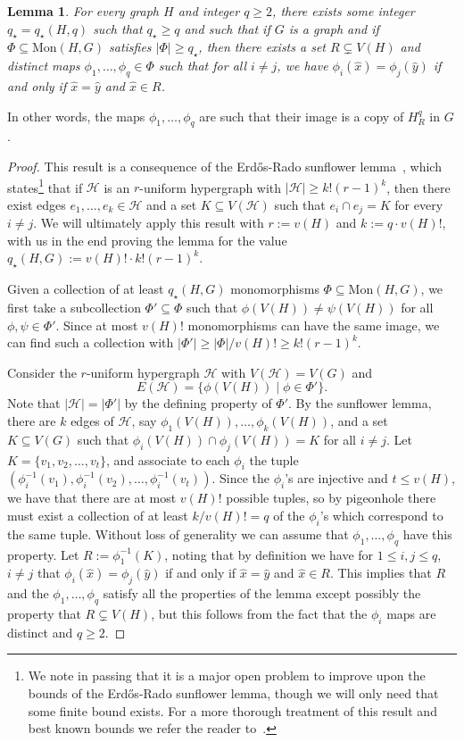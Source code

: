 \documentclass[12pt,letterpaper]{article}
\newtheorem{lemma}[theorem]{Lemma}
\theoremstyle{definition}
\newcommand{\pow}{q} %
\newcommand{\Pow}{{q_\star}} %
\renewcommand{\c}[1]{\mathcal{#1}}
\newcommand{\sub}{\subseteq}
\begin{document}
	
	\begin{lemma}\label{lemma:sunflower}
		For every graph $H$ and integer $\pow \ge 2$, there exists some integer $\Pow=\Pow(H,q)$ such that $\Pow\ge \pow$ and such that if $G$ is a graph and if $\Phi\subseteq \mathrm{Mon}(H,G)$ satisfies $|\Phi|\ge \Pow$, then there exists a set $R\subsetneq V(H)$ and distinct maps $\phi_1,\ldots,\phi_\pow\in \Phi$ such that for all $i\ne j$, we have $\phi_i(\hat{x})=\phi_j(\hat{y})$ if and only if $\hat{x}=\hat{y}$ and $\hat{x}\in R$.
	\end{lemma}
	In other words, the maps $\phi_1,\ldots,\phi_q$ are such that their image is a copy of $H_R^\pow$ in $G$.
	\begin{proof}
		This result is a consequence of the Erd\H{o}s-Rado sunflower lemma~\cite{ER1960}, which states\footnote{We note in passing that it is a major open problem to improve upon the bounds of the Erd\H{o}s-Rado sunflower lemma, though we will only need that some finite bound exists.  For a more thorough treatment of this result and best known bounds we refer the reader to~\cite{ALWZ2021}.} that if $\c{H}$ is an $r$-uniform hypergraph with $|\c{H}|\ge k!(r-1)^k$, then there exist edges $e_1,\ldots,e_k\in \c{H}$ and a set $K\sub V(\c{H})$ such that $e_i\cap e_j=K$ for every $i\ne j$. We will ultimately apply this result with $r:=v(H)$ and $k:=q\cdot v(H)!$, with us in the end proving the lemma for the value $\Pow(H,G):=v(H)!\cdot k!(r-1)^k$.
		
		Given a collection of at least $\Pow(H,G)$ monomorphisms $\Phi\subseteq \mathrm{Mon}(H,G)$, we first take a subcollection $\Phi'\subseteq \Phi$ such that $\phi(V(H))\neq \psi(V(H))$ for all $\phi,\psi\in \Phi'$. Since at most $v(H)!$ monomorphisms can have the same image, we can find such a collection with $|\Phi'|\geq |\Phi|/v(H)!\geq k!(r-1)^k$.
		
		Consider the $r$-uniform hypergraph $\mathcal{H}$ with $V(\mathcal{H})=V(G)$ and
		\[
		E(\mathcal{H})=\{\phi(V(H))\mid \phi\in \Phi'\}.
		\]
		Note that $|\mathcal{H}|=|\Phi'|$ by the defining property of $\Phi'$. By the sunflower lemma, there are $k$ edges of $\mathcal{H}$, say $\phi_1(V(H)),\dots,\phi_k(V(H))$, and a set $K\subseteq V(G)$ such that $\phi_i(V(H))\cap \phi_j(V(H))=K$ for all $i\neq j$. Let $K=\{v_1,v_2,\dots,v_t\}$, and associate to each $\phi_i$ the tuple $(\phi_i^{-1}(v_1),\phi_i^{-1}(v_2),\dots,\phi_i^{-1}(v_t))$. Since the $\phi_i$'s are injective and $t\leq v(H)$, we have that there are at most $v(H)!$ possible tuples, so by pigeonhole there must exist a collection of at least $k/v(H)!=q$ of the $\phi_i$'s which correspond to the same tuple.  Without loss of generality we can assume that $\phi_1,\dots,\phi_q$ have this property. Let $R:=\phi_1^{-1}(K)$, noting that by definition we have for $1\leq i,j\leq q$, $i\neq j$  that $\phi_i(\hat{x})=\phi_j(\hat{y})$ if and only if $\hat{x}=\hat{y}$ and $\hat{x}\in R$.  This implies that $R$ and the $\phi_1,\ldots,\phi_q$ satisfy all the properties of the lemma except possibly the property that $R\subsetneq V(H)$, but this follows from the fact that the $\phi_i$ maps are distinct and $q\ge 2$.
		

\end{proof}
\end{document}
